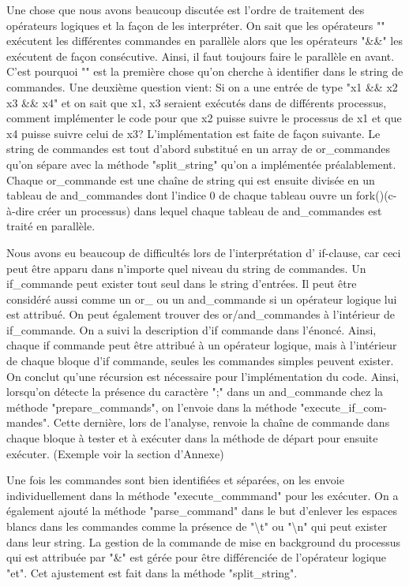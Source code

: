 \documentclass{article}
\begin{document}
Une chose que nous avons beaucoup discutée est l'ordre de traitement des opérateurs logiques et la façon de les interpréter. On sait que les opérateurs "\textbar \textbar" exécutent les différentes commandes en parallèle alors que les opérateurs "\&\&" les exécutent de façon consécutive. Ainsi, il faut toujours faire le parallèle en avant. 
C'est pourquoi "\textbar \textbar" est la première chose qu'on cherche à identifier dans le string de commandes. Une deuxième question vient: Si on a une entrée de type "x1 \&\& x2 \textbar\textbar  x3 \&\& x4" et on sait que x1, x3 seraient exécutés dans de différents processus, comment implémenter le code pour que x2 puisse suivre le processus de x1 et que x4 puisse suivre celui de x3? L'implémentation est faite de façon suivante. Le string de commandes est tout d'abord substitué en un array de or\_commandes qu'on sépare avec la méthode "split\_string" qu'on a implémentée préalablement. Chaque or\_commande est une chaîne de string qui est ensuite divisée en un tableau de and\_commandes dont l'indice 0 de chaque tableau ouvre un fork()(c-à-dire créer un processus) dans lequel chaque tableau de and\_commandes est traité en parallèle.



Nous avons eu beaucoup de difficultés lors de l'interprétation d' if-clause, car ceci peut être apparu dans n'importe quel niveau du string de commandes. Un if\_commande peut exister tout seul dans le string d'entrées. Il peut être considéré aussi comme un or\_ ou un and\_commande si un opérateur logique lui est attribué. On peut également trouver des or/and\_commandes à l'intérieur de if\_commande. On a suivi la description d'if commande dans l'énoncé. Ainsi, chaque if commande peut être attribué à un opérateur logique, mais à l'intérieur de chaque bloque d'if commande, seules les commandes simples peuvent exister. On conclut qu'une récursion est nécessaire pour l'implémentation du code. Ainsi, lorsqu'on détecte la présence du caractère ";" dans un and\_commande chez la méthode "prepare\_commands", on l'envoie dans la méthode "execute\_if\_com-mandes". Cette dernière, lors de l'analyse, renvoie la chaîne de commande dans chaque bloque à tester et à exécuter dans la méthode de départ pour ensuite exécuter. (Exemple voir la section d'Annexe)

Une fois les commandes sont bien identifiées et séparées, on les envoie individuellement dans la méthode "execute\_commmand" pour les exécuter. On a également ajouté la méthode "parse\_command" dans le but d'enlever les espaces blancs dans les commandes comme la présence de "\textbackslash t" ou "\textbackslash n" qui peut exister dans leur string. La gestion de la commande de mise en background du processus qui est attribuée par "\&" est gérée pour être différenciée de l'opérateur logique "et". Cet ajustement est fait dans la méthode "split\_string".
\end{document}
